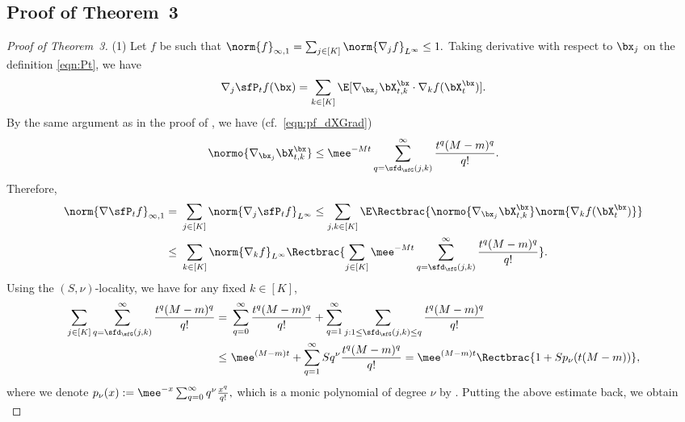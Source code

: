 \documentclass[11pt]{article}
\begin{document}
\subsection{Proof of Theorem~3}
\label{app:thm_Semigroup_loc}

\begin{proof}[Proof of Theorem~3]

(1) Let $f$ be such that
\(
    \norm{f}_{\infty,1} = \sum_{j\in[K]} \norm{ \nabla_j f }_{L^\infty} \le 1.
\)
Taking derivative with respect to $\bx_j$ on the definition \eqref{eqn:Pt}, we have 
\begin{equation}
    \nabla_j \sfP_t f(\bx) = \sum_{k \in [K]} \E [ \nabla_{\bx_j} \bX_{t,k}^\bx \cdot \nabla_k f(\bX_t^\bx) ].
\end{equation}
By the same argument as in the proof of , we have (cf.~\eqref{eqn:pf_dXGrad})
\begin{equation}
    \normo{ \nabla_{\bx_j} \bX_{t,k}^\bx } \le \mee^{-M t} \sum_{q=\sfd_\sfG(j,k)}^\infty \frac{t^q(M-m)^q}{q!}. 
\end{equation}
Therefore, 
\begin{equation}
\begin{split}
    \norm{\nabla \sfP_t f}_{\infty,1} =~& \sum_{j\in[K]} \norm{ \nabla_j \sfP_t f }_{L^\infty} \le \sum_{j,k\in[K]} \E \Rectbrac{ \normo{ \nabla_{\bx_j} \bX_{t,k}^\bx } \norm{ \nabla_k f(\bX_t^\bx) } } \\
    \le~& \sum_{k\in[K]} \norm{ \nabla_k f }_{L^\infty} \Rectbrac{ \sum_{j\in[K]} \mee^{-M t} \sum_{q=\sfd_\sfG(j,k)}^\infty \frac{t^q(M-m)^q}{q!} }.
\end{split}
\end{equation}
Using the $(S,\nu)$-locality, we have for any fixed $k\in[K]$,
\begin{equation}
\begin{split}
    \sum_{j\in[K]} \sum_{q=\sfd_\sfG(j,k)}^\infty \frac{t^q(M-m)^q}{q!} =~& \sum_{q=0}^\infty \frac{t^q(M-m)^q}{q!} + \sum_{q=1}^\infty \sum_{j:1\le \sfd_\sfG(j,k) \le q} \frac{t^q(M-m)^q}{q!} \\
    \le~& \mee^{(M-m)t} + \sum_{q=1}^\infty S q^\nu \frac{t^q(M-m)^q}{q!} = \mee^{(M-m)t} \Rectbrac{ 1 + S p_\nu ( t(M-m) ) }, 
\end{split}
\end{equation}
where we denote 
\(
    p_\nu(x) := \mee^{-x} \sum_{q=0}^\infty q^\nu \frac{x^q}{q!},
\)
which is a monic polynomial of degree $\nu$ by . Putting the above estimate back, we obtain
\begin{equation}

\end{equation}
\end{proof}
\end{document}
